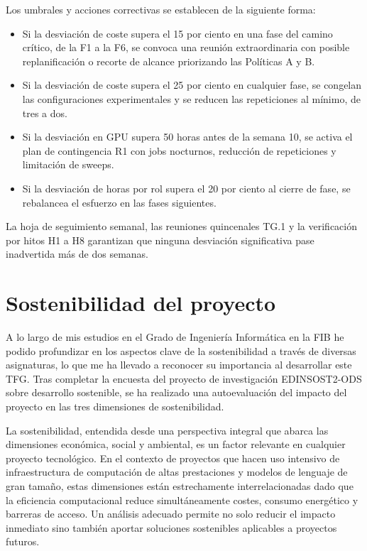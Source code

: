 \documentclass[11pt,a4paper]{article}
\begin{document}
Los umbrales y acciones correctivas se establecen de la siguiente forma:
\begin{itemize}[nosep]
\item Si la desviación de coste supera el 15 por ciento en una fase del camino crítico, de la F1 a la F6, se convoca una reunión extraordinaria con posible replanificación o recorte de alcance priorizando las Políticas A y B.
\item Si la desviación de coste supera el 25 por ciento en cualquier fase, se congelan las configuraciones experimentales y se reducen las repeticiones al mínimo, de tres a dos.
\item Si la desviación en GPU supera 50 horas antes de la semana 10, se activa el plan de contingencia R1 con jobs nocturnos, reducción de repeticiones y limitación de sweeps.
\item Si la desviación de horas por rol supera el 20 por ciento al cierre de fase, se rebalancea el esfuerzo en las fases siguientes.
\end{itemize}

\noindent La hoja de seguimiento semanal, las reuniones quincenales TG.1 y la verificación por hitos H1 a H8 garantizan que ninguna desviación significativa pase inadvertida más de dos semanas.

\section{Sostenibilidad del proyecto}

A lo largo de mis estudios en el Grado de Ingeniería Informática en la FIB he podido profundizar en los aspectos clave de la sostenibilidad a través de diversas asignaturas, lo que me ha llevado a reconocer su importancia al desarrollar este TFG. Tras completar la encuesta del proyecto de investigación EDINSOST2-ODS sobre desarrollo sostenible, se ha realizado una autoevaluación del impacto del proyecto en las tres dimensiones de sostenibilidad.

La sostenibilidad, entendida desde una perspectiva integral que abarca las dimensiones económica, social y ambiental, es un factor relevante en cualquier proyecto tecnológico. En el contexto de proyectos que hacen uso intensivo de infraestructura de computación de altas prestaciones y modelos de lenguaje de gran tamaño, estas dimensiones están estrechamente interrelacionadas dado que la eficiencia computacional reduce simultáneamente costes, consumo energético y barreras de acceso. Un análisis adecuado permite no solo reducir el impacto inmediato sino también aportar soluciones sostenibles aplicables a proyectos futuros.
\end{document}
